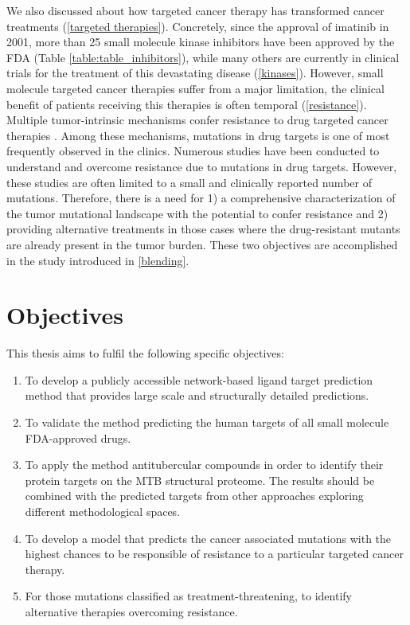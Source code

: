 \documentclass[11pt, b5paper,twoside]{tesi_upf}
\begin{document}
We also discussed about how targeted cancer therapy has transformed cancer treatments (\cref{targeted therapies}). Concretely, since the approval of imatinib in 2001, more than 25 small molecule kinase inhibitors have been approved by the FDA (Table \ref{table:table_inhibitors}), while many others are currently in clinical trials for the treatment of this devastating disease (\cref{kinases}). However, small molecule targeted cancer therapies suffer from a major limitation, the clinical benefit of patients receiving this therapies is often temporal (\cref{resistance}). Multiple tumor-intrinsic mechanisms confer resistance to drug targeted cancer therapies \cite{Holohan2013}. Among these mechanisms, mutations in drug targets is one of most frequently observed in the clinics. Numerous studies have been conducted to understand and overcome resistance due to mutations in drug targets. However, these studies are often limited to a small and clinically reported number of mutations. Therefore, there is a need for 1) a comprehensive characterization of the tumor mutational landscape with the potential to confer resistance and 2) providing alternative treatments in those cases where the drug-resistant mutants are already present in the tumor burden. These two objectives are accomplished in the study introduced in \cref{blending}. 

\section{Objectives}


This thesis aims to fulfil the following specific objectives: 


\begin{enumerate}[label=\roman*]

\item To develop a publicly accessible network-based ligand target prediction method that provides large scale and structurally detailed predictions. 

\item To validate the method predicting the human targets of all small molecule FDA-approved drugs. 

\item To apply the method antitubercular compounds in order to identify their protein targets on the MTB structural proteome. The results should be combined with the predicted targets from other approaches exploring different methodological spaces.  
 
\item To develop a model that predicts the cancer associated mutations with the highest chances to be responsible of resistance to a  particular targeted cancer therapy. 

\item For those mutations classified as treatment-threatening, to identify alternative therapies overcoming resistance.


\end{enumerate}
\end{document}
